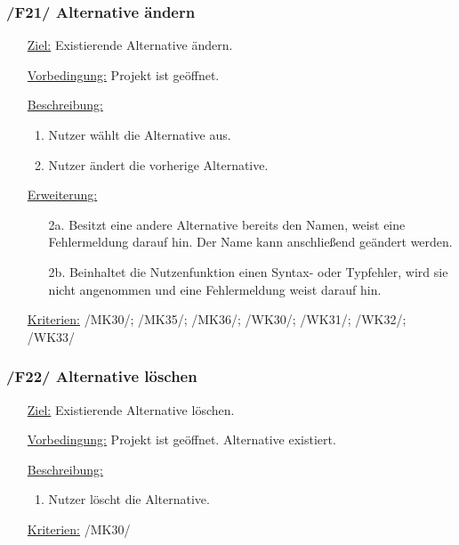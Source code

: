 \documentclass{article}
\begin{document}
\subsubsection*{/F21/ Alternative ändern}
\begin{itemize}
    \item[\underline{Ziel:}] Existierende Alternative ändern.
    \item[\underline{Vorbedingung:}] Projekt ist geöffnet. 
    \item[\underline{Beschreibung:}]
    \begin{enumerate}
        \item Nutzer wählt die Alternative aus.
        \item Nutzer ändert die vorherige Alternative.
    \end{enumerate}
    \item[\underline{Erweiterung:}]
    \begin{itemize}
        \item[2a.] Besitzt eine andere Alternative bereits den Namen, weist eine Fehlermeldung darauf hin. Der Name kann anschließend geändert werden.
        \item[2b.] Beinhaltet die Nutzenfunktion einen Syntax- oder Typfehler, wird sie nicht angenommen und eine Fehlermeldung weist darauf hin.
    \end{itemize}
    \item[\underline{Kriterien:}] /MK30/; /MK35/; /MK36/; /WK30/; /WK31/; /WK32/; /WK33/
\end{itemize}

\subsubsection*{/F22/ Alternative löschen}
\begin{itemize}
    \item[\underline{Ziel:}] Existierende Alternative löschen.
    \item[\underline{Vorbedingung:}] Projekt ist geöffnet. Alternative existiert.
    \item[\underline{Beschreibung:}]
    \begin{enumerate}
        \item Nutzer löscht die Alternative.
    \end{enumerate}
    \item[\underline{Kriterien:}] /MK30/
\end{itemize}
\end{document}
